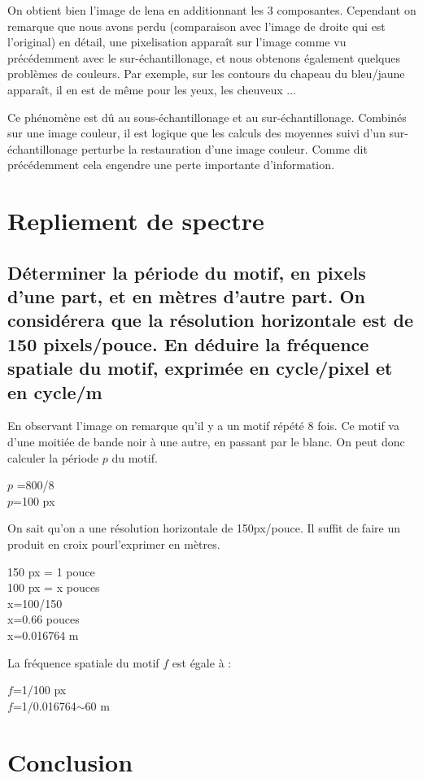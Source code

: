 \documentclass[a4paper,12pt]{report}
\begin{document}
\noindent On obtient bien l'image de lena en additionnant les 3 composantes. Cependant on remarque que nous avons perdu (comparaison avec l'image de droite qui est l'original) en détail, une pixelisation apparaît sur l'image comme vu précédemment avec le sur-échantillonage, et nous obtenons également quelques problèmes de couleurs. Par exemple, sur les contours du chapeau du bleu/jaune apparaît, il en est de même pour les yeux, les cheuveux ...

Ce phénomène est dû au sous-échantillonage et au sur-échantillonage. Combinés sur une image couleur, il est logique que les calculs des moyennes suivi d'un sur-échantillonage perturbe la restauration d'une image couleur. Comme dit précédemment cela engendre une perte importante d'information.

\newpage
\section*{Repliement de spectre}


\subsection*{Déterminer la période du motif, en pixels d'une part, et en mètres d'autre part. On considérera que la résolution horizontale est de 150 pixels/pouce. En déduire la fréquence spatiale du motif, exprimée en cycle/pixel et en cycle/m}

\noindent En observant l'image on remarque qu'il y a un motif répété 8 fois. Ce motif va d'une moitiée de bande noir à une autre, en passant par le blanc. On peut donc calculer la période $p$ du motif.\\
\begin{center}
$p$ =800/8\\
$p$=100 px \\
\end{center}

\noindent On sait qu'on a une résolution horizontale de 150px/pouce. Il  suffit de faire un produit en croix pourl'exprimer en mètres.\\
\begin{center}
150 px = 1 pouce\\
100 px = x pouces\\
x=100/150\\
x=0.66 pouces\\
x=0.016764 m \\ 
\end{center}
La fréquence spatiale du motif $f$ est égale à :
\begin{center}
$f$=1/100 px\\
$f$=1/0.016764$\sim$60 m\\
\end{center}


\newpage
\section*{Conclusion}
\end{document}
